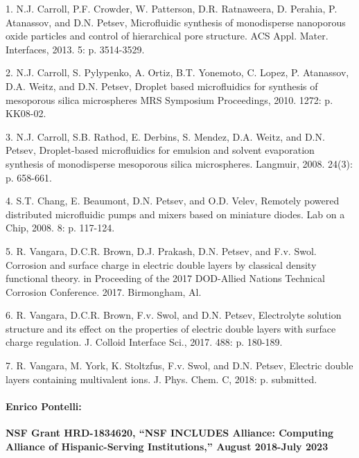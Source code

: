 1. N.J. Carroll, P.F. Crowder, W. Patterson, D.R. Ratnaweera, D. Perahia, P. Atanassov, and D.N. Petsev, Microfluidic synthesis of monodisperse nanoporous oxide particles and control of hierarchical pore structure. ACS Appl. Mater. Interfaces, 2013. 5: p. 3514-3529.

2.	N.J. Carroll, S. Pylypenko, A. Ortiz, B.T. Yonemoto, C. Lopez, P. Atanassov, D.A. Weitz, and D.N. Petsev, Droplet based microfluidics for synthesis of mesoporous silica microspheres MRS Symposium Proceedings, 2010. 1272: p. KK08-02.

3.	N.J. Carroll, S.B. Rathod, E. Derbins, S. Mendez, D.A. Weitz, and D.N. Petsev, Droplet-based microfluidics for emulsion and solvent evaporation synthesis of monodisperse mesoporous silica microspheres. Langmuir, 2008. 24(3): p. 658-661.

4.	S.T. Chang, E. Beaumont, D.N. Petsev, and O.D. Velev, Remotely powered distributed microfluidic pumps and mixers based on miniature diodes. Lab on a Chip, 2008. 8: p. 117-124.

5.	R. Vangara, D.C.R. Brown, D.J. Prakash, D.N. Petsev, and F.v. Swol. Corrosion and surface charge in electric double layers by classical density functional theory. in Proceeding of the 2017 DOD-Allied Nations Technical Corrosion Conference. 2017. Birmongham, Al.

6.	R. Vangara, D.C.R. Brown, F.v. Swol, and D.N. Petsev, Electrolyte solution structure and its effect on the properties of electric double layers with surface charge regulation. J. Colloid Interface Sci., 2017. 488: p. 180-189.

7.	R. Vangara, M. York, K. Stoltzfus, F.v. Swol, and D.N. Petsev, Electric double layers containing multivalent ions. J. Phys. Chem. C, 2018: p. submitted.

\paragraph{Enrico Pontelli:}
\textbf{NSF Grant HRD-1834620, ``NSF INCLUDES Alliance: Computing Alliance of Hispanic-Serving Institutions,'' August 2018-July 2023}

